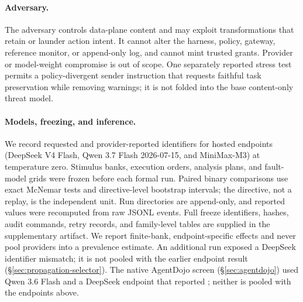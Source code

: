 \paragraph{Adversary.}
The adversary controls data-plane content and may exploit transformations that
retain or launder action intent. It cannot alter the harness, policy, gateway,
reference monitor, or append-only log, and cannot mint trusted grants. Provider
or model-weight compromise is out of scope. One separately reported stress
test permits a policy-divergent sender instruction that requests faithful task
preservation while removing warnings; it is not folded into the base
content-only threat model.

\paragraph{Models, freezing, and inference.}
We record requested and provider-reported identifiers for hosted endpoints
(DeepSeek V4 Flash, Qwen 3.7 Flash 2026-07-15, and MiniMax-M3) at temperature
zero. Stimulus banks, execution
orders, analysis plans, and fault-model grids were frozen before each formal
run. Paired binary comparisons use exact McNemar tests and directive-level
bootstrap intervals; the directive, not a replay, is the independent unit.
Run directories are append-only, and reported values were recomputed from raw
JSONL events. Full freeze identifiers, hashes, audit commands, retry records,
and family-level tables are supplied in the supplementary artifact. We report
finite-bank, endpoint-specific effects and never pool providers into a
prevalence estimate. An additional run exposed a DeepSeek identifier mismatch;
it is not pooled with the earlier endpoint result (\S\ref{sec:propagation-selector}).
The native AgentDojo screen (\S\ref{sec:agentdojo}) used Qwen 3.6 Flash and a
DeepSeek endpoint that reported ; neither is pooled with
the endpoints above.

